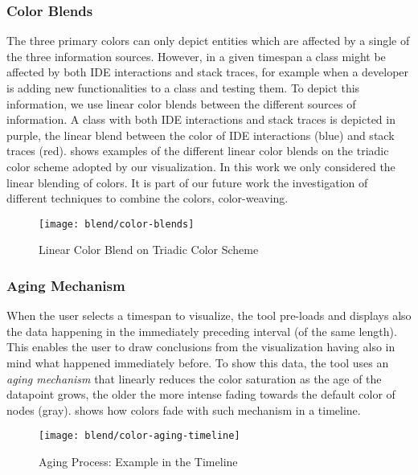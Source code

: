 \subsubsection{Color Blends}

The three primary colors can only depict entities which are affected by a single of the three information sources.
However, in a given timespan a class might be affected by both IDE interactions and stack traces, for example when a developer is adding new functionalities to a class and testing them.
To depict this information, we use linear color blends between the different sources of information.
A class with both IDE interactions and stack traces is depicted in purple, the linear blend between the color of IDE interactions (\ie blue) and stack traces (\ie red).
 shows examples of the different linear color blends on the triadic color scheme adopted by our visualization.
In this work we only considered the linear blending of colors.
It is part of our future work the investigation of different techniques to combine the colors, \ie color-weaving.

\begin{figure}[ht]
\centering
\texttt{[image: blend/color-blends]}
\caption{Linear Color Blend on Triadic Color Scheme}
\label{fig:color-blends}
\end{figure}


\subsubsection{Aging Mechanism}

When the user selects a timespan to visualize, the tool pre-loads and displays also the data happening in the immediately preceding interval (of the same length).
This enables the user to draw conclusions from the visualization having also in mind what happened immediately before.
To show this data, the tool uses an \emph{aging mechanism} that linearly reduces the color saturation as the age of the datapoint grows, \ie the older the more intense fading towards the default color of nodes (\ie gray).
 shows how colors fade with such mechanism in a timeline.

\begin{figure}[h!]
\centering
\texttt{[image: blend/color-aging-timeline]}
\caption{Aging Process: Example in the Timeline}
\label{fig:color-aging-timeline}
\end{figure}


